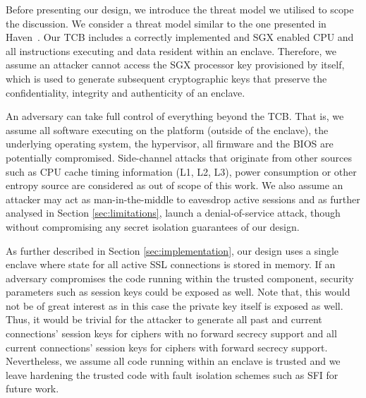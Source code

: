 \documentclass[../main.tex]{subfiles}
\begin{document}
Before presenting our design, we introduce the threat model we
utilised to scope the discussion. We consider a threat model similar
to the one presented in Haven~\cite{Baumann14}. Our TCB includes a
correctly implemented and SGX enabled CPU and all instructions
executing and data resident within an enclave. Therefore, we assume an
attacker cannot access the SGX processor key provisioned by \Intel
itself, which is used to generate subsequent cryptographic keys that
preserve the confidentiality, integrity and authenticity of an
enclave.

An adversary can take full control of everything beyond the TCB. That
is, we assume all software executing on the platform (outside of the
enclave), the underlying operating system, the hypervisor, all
firmware and the BIOS are potentially compromised. Side-channel
attacks that originate from other sources such as CPU cache timing
information (L1, L2, L3), power consumption or other entropy source
are considered as out of scope of this work. We also assume an
attacker may act as man-in-the-middle to eavesdrop active sessions
and as further analysed in Section \ref{sec:limitations}, launch
a denial-of-service attack, though without compromising any secret
isolation guarantees of our design.

As further described in Section \ref{sec:implementation}, our design
uses a single enclave where state for all active SSL connections is
stored in memory. If an adversary compromises the code running within
the trusted component, security parameters such as session keys could
be exposed as well. Note that, this would not be of great interest as
in this case the private key itself is exposed as well. Thus, it
would be trivial for the attacker to generate all past and current
connections' session keys for ciphers with no forward secrecy support
and all current connections' session keys for ciphers with forward
secrecy support. Nevertheless, we assume all code running within
an enclave is trusted and we leave hardening the trusted code
with fault isolation schemes such as SFI \cite{wahbe1994efficient}
for future work.
\end{document}
